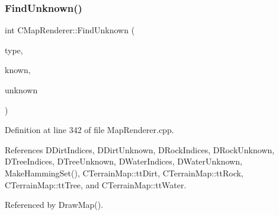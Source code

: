 \subsubsection{\texorpdfstring{Find\+Unknown()}{FindUnknown()}}
{\footnotesize\ttfamily int C\+Map\+Renderer\+::\+Find\+Unknown (\begin{DoxyParamCaption}\item[{\hyperlink{classCTerrainMap_aff2ab991e237269941416dd79d8871d4}{C\+Terrain\+Map\+::\+E\+Tile\+Type}}]{type,  }\item[{int}]{known,  }\item[{int}]{unknown }\end{DoxyParamCaption})\hspace{0.3cm}{\ttfamily [protected]}}



Definition at line 342 of file Map\+Renderer.\+cpp.



References D\+Dirt\+Indices, D\+Dirt\+Unknown, D\+Rock\+Indices, D\+Rock\+Unknown, D\+Tree\+Indices, D\+Tree\+Unknown, D\+Water\+Indices, D\+Water\+Unknown, Make\+Hamming\+Set(), C\+Terrain\+Map\+::tt\+Dirt, C\+Terrain\+Map\+::tt\+Rock, C\+Terrain\+Map\+::tt\+Tree, and C\+Terrain\+Map\+::tt\+Water.



Referenced by Draw\+Map().


